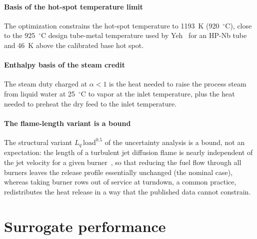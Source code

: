 \documentclass[final,3p,times]{elsarticle}
\begin{document}
\paragraph{Basis of the hot-spot temperature limit} The optimization constrains the hot-spot temperature to 1193~K (920~$^\circ$C), close to the 925~$^\circ$C design tube-metal temperature used by Yeh~\cite{yeh2021} for an HP-Nb tube and 46~K above the calibrated base hot spot.

\paragraph{Enthalpy basis of the steam credit} The steam duty charged at $\alpha < 1$ is the heat needed to raise the process steam from liquid water at 25~$^\circ$C to vapor at the inlet temperature, plus the heat needed to preheat the dry feed to the inlet temperature.

\paragraph{The flame-length variant is a bound} The structural variant $L_q\,\mathrm{load}^{0.5}$ of the uncertainty analysis is a bound, not an expectation: the length of a turbulent jet diffusion flame is nearly independent of the jet velocity for a given burner~\cite{hawthorne1949}, so that reducing the fuel flow through all burners leaves the release profile essentially unchanged (the nominal case), whereas taking burner rows out of service at turndown, a common practice, redistributes the heat release in a way that the published data cannot constrain.

\section{Surrogate performance}
\label{sec:surrogate}
\end{document}
